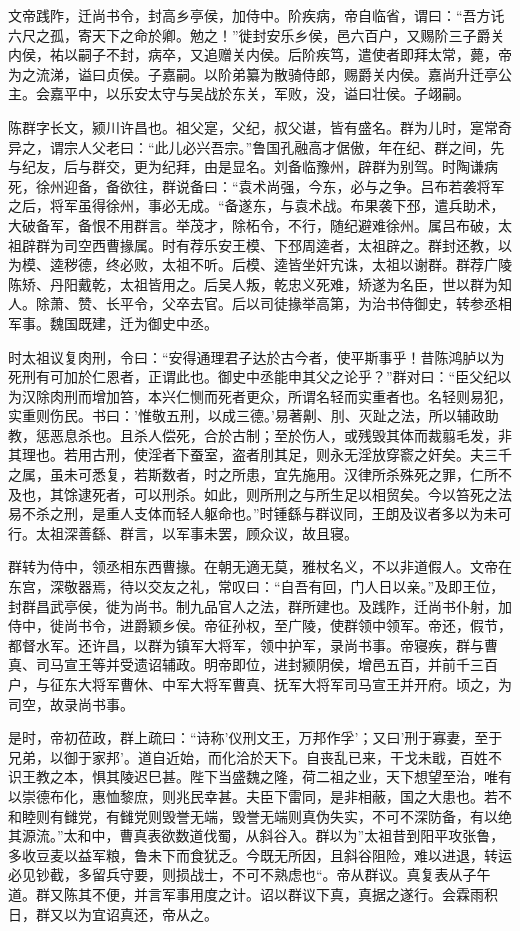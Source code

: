 \documentclass[12pt,UTF8]{ctexbook}
\begin{document}
文帝践阼，迁尚书令，封高乡亭侯，加侍中。阶疾病，帝自临省，谓曰：“吾方讬六尺之孤，寄天下之命於卿。勉之！”徙封安乐乡侯，邑六百户，又赐阶三子爵关内侯，祐以嗣子不封，病卒，又追赠关内侯。后阶疾笃，遣使者即拜太常，薨，帝为之流涕，谥曰贞侯。子嘉嗣。以阶弟纂为散骑侍郎，赐爵关内侯。嘉尚升迁亭公主。会嘉平中，以乐安太守与吴战於东关，军败，没，谥曰壮侯。子翊嗣。

陈群字长文，颍川许昌也。祖父寔，父纪，叔父谌，皆有盛名。群为儿时，寔常奇异之，谓宗人父老曰：“此儿必兴吾宗。”鲁国孔融高才倨傲，年在纪、群之间，先与纪友，后与群交，更为纪拜，由是显名。刘备临豫州，辟群为别驾。时陶谦病死，徐州迎备，备欲往，群说备曰：“袁术尚强，今东，必与之争。吕布若袭将军之后，将军虽得徐州，事必无成。“备遂东，与袁术战。布果袭下邳，遣兵助术，大破备军，备恨不用群言。举茂才，除柘令，不行，随纪避难徐州。属吕布破，太祖辟群为司空西曹掾属。时有荐乐安王模、下邳周逵者，太祖辟之。群封还教，以为模、逵秽德，终必败，太祖不听。后模、逵皆坐奸宄诛，太祖以谢群。群荐广陵陈矫、丹阳戴乾，太祖皆用之。后吴人叛，乾忠义死难，矫遂为名臣，世以群为知人。除萧、赞、长平令，父卒去官。后以司徒掾举高第，为治书侍御史，转参丞相军事。魏国既建，迁为御史中丞。

时太祖议复肉刑，令曰：“安得通理君子达於古今者，使平斯事乎！昔陈鸿胪以为死刑有可加於仁恩者，正谓此也。御史中丞能申其父之论乎？”群对曰：“臣父纪以为汉除肉刑而增加笞，本兴仁恻而死者更众，所谓名轻而实重者也。名轻则易犯，实重则伤民。书曰：'惟敬五刑，以成三德。'易著劓、刖、灭趾之法，所以辅政助教，惩恶息杀也。且杀人偿死，合於古制；至於伤人，或残毁其体而裁翦毛发，非其理也。若用古刑，使淫者下蚕室，盗者刖其足，则永无淫放穿窬之奸矣。夫三千之属，虽未可悉复，若斯数者，时之所患，宜先施用。汉律所杀殊死之罪，仁所不及也，其馀逮死者，可以刑杀。如此，则所刑之与所生足以相贸矣。今以笞死之法易不杀之刑，是重人支体而轻人躯命也。”时锺繇与群议同，王朗及议者多以为未可行。太祖深善繇、群言，以军事未罢，顾众议，故且寝。

群转为侍中，领丞相东西曹掾。在朝无適无莫，雅杖名义，不以非道假人。文帝在东宫，深敬器焉，待以交友之礼，常叹曰：“自吾有回，门人日以亲。”及即王位，封群昌武亭侯，徙为尚书。制九品官人之法，群所建也。及践阼，迁尚书仆射，加侍中，徙尚书令，进爵颖乡侯。帝征孙权，至广陵，使群领中领军。帝还，假节，都督水军。还许昌，以群为镇军大将军，领中护军，录尚书事。帝寝疾，群与曹真、司马宣王等并受遗诏辅政。明帝即位，进封颍阴侯，增邑五百，并前千三百户，与征东大将军曹休、中军大将军曹真、抚军大将军司马宣王并开府。顷之，为司空，故录尚书事。

是时，帝初莅政，群上疏曰：“诗称'仪刑文王，万邦作孚'；又曰'刑于寡妻，至于兄弟，以御于家邦'。道自近始，而化洽於天下。自丧乱已来，干戈未戢，百姓不识王教之本，惧其陵迟巳甚。陛下当盛魏之隆，荷二祖之业，天下想望至治，唯有以崇德布化，惠恤黎庶，则兆民幸甚。夫臣下雷同，是非相蔽，国之大患也。若不和睦则有雠党，有雠党则毁誉无端，毁誉无端则真伪失实，不可不深防备，有以绝其源流。”太和中，曹真表欲数道伐蜀，从斜谷入。群以为”太祖昔到阳平攻张鲁，多收豆麦以益军粮，鲁未下而食犹乏。今既无所因，且斜谷阻险，难以进退，转运必见钞截，多留兵守要，则损战士，不可不熟虑也“。帝从群议。真复表从子午道。群又陈其不便，并言军事用度之计。诏以群议下真，真据之遂行。会霖雨积日，群又以为宜诏真还，帝从之。
\end{document}
